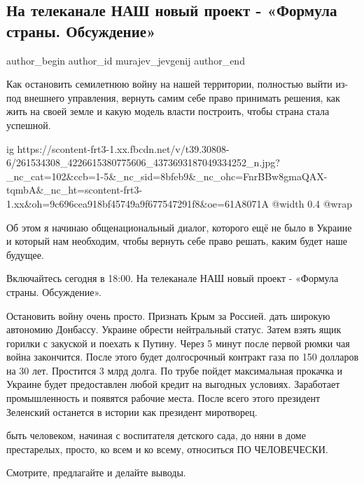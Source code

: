  
 
 
 
 
 
\subsection{На телеканале НАШ новый проект - «Формула страны. Обсуждение»}
\label{sec:26_11_2021.fb.murajev_jevgenij.1.formula_strany}
 
\ifcmt
 author_begin
   author_id murajev_jevgenij
 author_end
\fi

Как остановить семилетнюю войну на нашей территории, полностью выйти из-под
внешнего управления, вернуть самим себе право принимать решения, как жить на
своей земле и какую модель власти построить, чтобы страна стала успешной. 

\ifcmt
  ig https://scontent-frt3-1.xx.fbcdn.net/v/t39.30808-6/261534308_4226615380775606_4373693187049334252_n.jpg?_nc_cat=102&ccb=1-5&_nc_sid=8bfeb9&_nc_ohc=FnrBBw8gmaQAX-tqmbA&_nc_ht=scontent-frt3-1.xx&oh=9c696cea918bf45749a9f677547291f8&oe=61A8071A
  @width 0.4
  @wrap 
\fi

Об этом я начинаю общенациональный диалог, которого ещё не было в Украине и
который нам необходим, чтобы вернуть себе право решать, каким будет наше
будущее. 

Включайтесь сегодня в 18:00. На телеканале НАШ новый проект - «Формула страны.
Обсуждение». 

\begin{cmtfront}

Остановить войну очень просто. Признать Крым за Россией. дать широкую автономию
Донбассу. Украине обрести нейтральный статус. Затем взять ящик горилки с
закуской и поехать к Путину. Через 5 минут после первой рюмки чая война
закончится. После этого будет долгосрочный контракт газа по 150 долларов на 30
лет. Простится 3 млрд долга. По трубе пойдет максимальная прокачка и Украине
будет предоставлен любой кредит на выгодных условиях. Заработает промышленность
и появятся рабочие места. После всего этого президент Зеленский останется в
истории как президент миротворец.	


быть человеком, начиная с воспитателя детского сада, до няни в доме
престарелых, просто, ко всем и ко всему, относиться ПО ЧЕЛОВЕЧЕСКИ.

\end{cmtfront}

Смотрите, предлагайте и делайте выводы.

